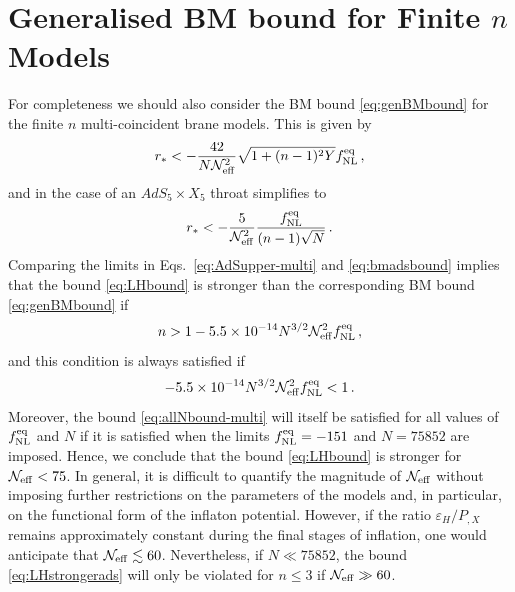 \section{Generalised BM bound for Finite \texorpdfstring{$n$}{n} Models}
\label{sec:apx-genbmbound}


For completeness we should also consider the 
BM bound \eqref{eq:genBMbound} for the finite $n$ multi-coincident brane models. This is
given by 
% 
\begin{equation}
\label{eq:BMAdS-multi}
r_* < -\frac{42}{N \mathcal{N}_\mathrm{eff}^2}\sqrt{1 +(n-1)^2Y}f_{\mathrm{NL}}^{\mathrm{eq}} \,,
\end{equation}
%  
and in the case of an $AdS_5 \times X_5$ throat simplifies to
%  
\begin{equation}
\label{eq:bmadsbound}
r_* < -\frac{5}{\mathcal{N}_\mathrm{eff}^2} 
\frac{f_{\mathrm{NL}}^{\mathrm{eq}}}{(n-1)\sqrt{N}} \,.
\end{equation}
%  
Comparing the limits in Eqs.~\eqref{eq:AdSupper-multi} and
\eqref{eq:bmadsbound} 
implies that the bound \eqref{eq:LHbound} is stronger than the corresponding BM
bound \eqref{eq:genBMbound} if 
% 
\begin{equation}
\label{eq:LHstrongerads}
n > 1 -5.5 \times 10^{-14} N^{3/2} \mathcal{N}_\mathrm{eff}^2 f_{\mathrm{NL}}^{\mathrm{eq}} \,,
\end{equation}
% 
and this condition is always satisfied if 
% 
\begin{equation}
\label{eq:allNbound-multi}
-5.5 \times 10^{-14} N^{3/2} \mathcal{N}_\mathrm{eff}^2 f_{\mathrm{NL}}^{\mathrm{eq}}  <1  \, .
\end{equation}
% 
Moreover, the bound \eqref{eq:allNbound-multi} will itself be satisfied for 
all values of $f_{\mathrm{NL}}^{\mathrm{eq}}$ and $N$ if it is satisfied when the limits 
$f_{\mathrm{NL}}^{\mathrm{eq}} =-151$ and $N=75852$ are imposed. Hence, we conclude that the bound
\eqref{eq:LHbound} 
is stronger for $\mathcal{N}_\mathrm{eff} < 75$. 
In general, it is difficult to quantify 
the magnitude of $\mathcal{N}_\mathrm{eff}$ without 
imposing further restrictions on the parameters of the models 
and, in particular, on the functional form of the inflaton potential. 
However, if the ratio $\varepsilon_H/P_{,X}$ remains approximately 
constant during the final stages of inflation, one would anticipate that 
$\mathcal{N}_\mathrm{eff} \lesssim 60$. Nevertheless, if $N \ll 75852$, the bound 
\eqref{eq:LHstrongerads} will only be violated for $n \le 3$ if 
$\mathcal{N}_\mathrm{eff} \gg 60$.


